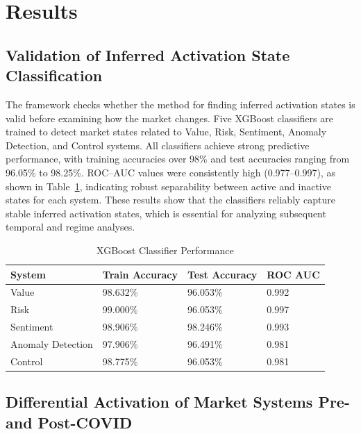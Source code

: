\documentclass[runningheads,10pt]{llncs}
\begin{document}
\vspace{-15pt}
\section{Results}
\subsection{Validation of Inferred Activation State Classification}
\vspace{-5pt}
The framework checks whether the method for finding inferred activation states is valid before examining how the market changes. Five XGBoost classifiers are trained to detect market states related to Value, Risk, Sentiment, Anomaly Detection, and Control systems. All classifiers achieve strong predictive performance, with training accuracies over 98\% and test accuracies ranging from 96.05\% to 98.25\%. ROC--AUC values were consistently high (0.977--0.997), as shown in Table~\ref{tab:performance}, indicating robust separability between active and inactive states for each system. These results show that the classifiers reliably capture stable inferred activation states, which is essential for analyzing subsequent temporal and regime analyses.
\small
\begin{table}[ht]
\caption{XGBoost Classifier Performance}\label{tab:performance}
\centering
\begin{tabular}{llll}
\toprule
\textbf{System} & \textbf{Train Accuracy} & \textbf{Test Accuracy} & \textbf{ROC AUC} \\
\midrule
Value            & 98.632\% & 96.053\% & 0.992 \\
Risk             & 99.000\% & 96.053\% & 0.997 \\
Sentiment        & 98.906\% & 98.246\% & 0.993 \\
Anomaly Detection & 97.906\% & 96.491\% & 0.981 \\
Control          & 98.775\% & 96.053\% & 0.981 \\
\bottomrule
\end{tabular}
\end{table}
\vspace{-10pt}
\subsection{Differential Activation of Market Systems Pre- and Post-COVID}
\end{document}
